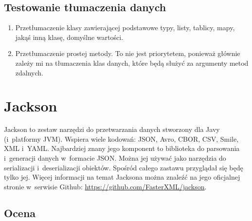 \subsection{Testowanie tłumaczenia danych}
\begin{enumerate}
	\item Przetłumaczenie klasy zawierającej podstawowe typy, listy, tablicy, mapy, jakąś inną klasę, domyślne wartości.
	\item Przetłumaczenie prostej metody. To nie jest priorytetem, ponieważ głównie zależy mi na tłumaczenia klas danych, które będą służyć za argumenty metod zdalnych.
\end{enumerate}



\section{Jackson}
\label{jackson}
Jackson to zestaw narzędzi do przetwarzania danych stworzony dla Javy (i~platformy JVM).
Wspiera wiele kodowań: JSON, Avro, CBOR, CSV, Smile, XML i~YAML.
Najbardziej znany jego komponent to biblioteka do parsowania i~generacji danych w~formacie JSON.
Można jej używać jako narzędzia do serializacji i~deserializacji obiektów.
Spośród całego zastawu przyglądał się będę tylko jej.
Więcej informacji na temat Jacksona można znaleźć na jego oficjalnej stronie w~serwisie Github: \url{https://github.com/FasterXML/jackson}.

\subsection{Ocena}

